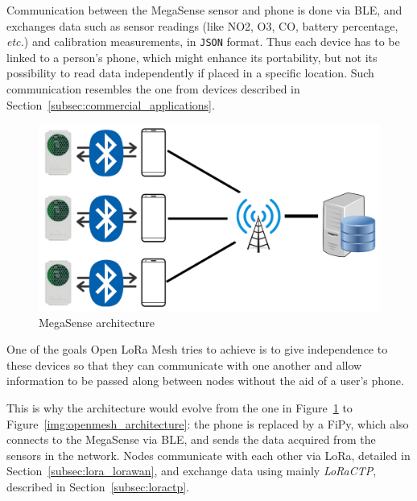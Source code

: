 		Communication between the MegaSense sensor and phone is done via BLE, and exchanges data such as sensor readings (like NO2, O3, CO, battery percentage, \textit{etc.}) and calibration measurements, in \texttt{JSON} format.
		Thus each device has to be linked to a person's phone, which might enhance its portability, but not its possibility to read data independently if placed in a specific location.
		Such communication resembles the one from devices described in Section~\ref{subsec:commercial_applications}.
		
		\begin{figure}[h]
			\centering
			\includegraphics[width=.75\textwidth]{resources/img/chap5/architecture_megasense}
			\caption{MegaSense architecture}
			\label{img:megasense_architecture}
		\end{figure}
	
		One of the goals Open LoRa Mesh tries to achieve is to give independence to these devices so that they can communicate with one another and allow information to be passed along between nodes without the aid of a user's phone.
	
		This is why the architecture would evolve from the one in Figure~\ref{img:megasense_architecture} to Figure~\ref{img:openmesh_architecture}: the phone is replaced by a FiPy, which also connects to the MegaSense via BLE, and sends the data acquired from the sensors in the network.
		Nodes communicate with each other via LoRa, detailed in Section~\ref{subsec:lora_lorawan}, and exchange data using mainly \textit{LoRaCTP}, described in Section~\ref{subsec:loractp}.
		
